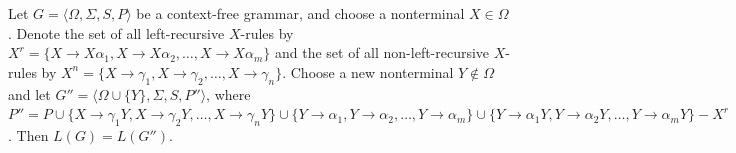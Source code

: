 \begin{lmm}\label{lmm-9.2}
Let $G=\langle\Omega,\Sigma,S,P\rangle$ be a context-free grammar, and choose a
nonterminal $X\in\Omega$. Denote the set of all left-recursive $X$-rules by $X^r =
\{X\rightarrow X\alpha_1,X\rightarrow X\alpha_2,\ldots,X\rightarrow X\alpha_m\}$
and the set of all non-left-recursive $X$-rules by $X^n=\{X\rightarrow\gamma_1,X
\rightarrow\gamma_2,\ldots,X\rightarrow\gamma_n\}$. Choose a new nonterminal $Y
\not \in\Omega$ and let $G'' = \langle\Omega\cup\{Y\},\Sigma,S,P''\rangle$, where
$P'' = P\cup\{X\rightarrow\gamma_1Y,X\rightarrow\gamma_2Y,\ldots,X\rightarrow
\gamma_nY\}\cup\{Y\rightarrow\alpha_1,Y\rightarrow\alpha_2,\ldots,Y\rightarrow
\alpha_m\}\cup\{Y\rightarrow\alpha_1Y,Y\rightarrow\alpha_2Y,\ldots,Y\rightarrow
\alpha_mY\}-X^r$. Then $L(G) = L(G'')$.


\end{lmm}
